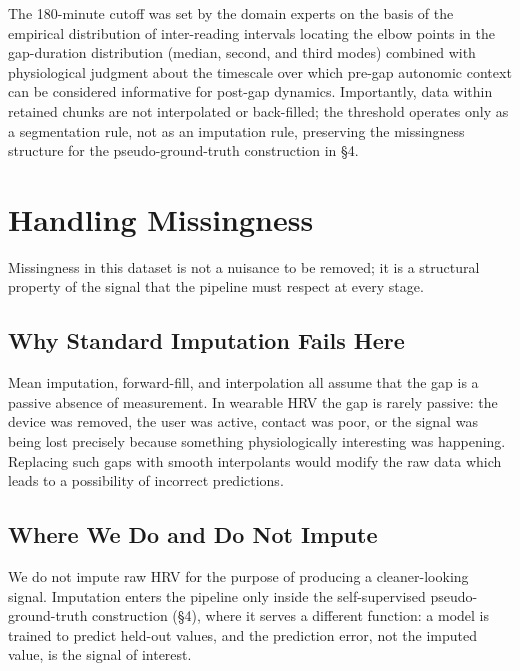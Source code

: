 \documentclass[11pt, a4paper]{article}
\theoremstyle{plain}
\theoremstyle{definition}
\begin{document}
The 180-minute cutoff was set by the domain experts on the basis of the
empirical distribution of inter-reading intervals locating the elbow points
in the gap-duration distribution (median, second, and third modes) combined
with physiological judgment about the timescale over which pre-gap autonomic
context can be considered informative for post-gap dynamics. Importantly,
data within retained chunks are not interpolated or back-filled; the
threshold operates only as a segmentation rule, not as an imputation rule,
preserving the missingness structure for the pseudo-ground-truth
construction in \S4.

\section{Handling Missingness}

Missingness in this dataset is not a nuisance to be removed; it is a
structural property of the signal that the pipeline must respect at every
stage.

\subsection{Why Standard Imputation Fails Here}

Mean imputation, forward-fill, and interpolation all assume that the gap is
a passive absence of measurement. In wearable HRV the gap is rarely passive:
the device was removed, the user was active, contact was poor, or the
signal was being lost precisely because something physiologically
interesting was happening. Replacing such gaps with smooth interpolants
would modify the raw data which leads to a possibility of incorrect
predictions.

\subsection{Where We Do and Do Not Impute}

We do not impute raw HRV for the purpose of producing a cleaner-looking
signal. Imputation enters the pipeline only inside the self-supervised
pseudo-ground-truth construction (\S4), where it serves a different
function: a model is trained to predict held-out values, and the prediction
error, not the imputed value, is the signal of interest.

\end{document}
